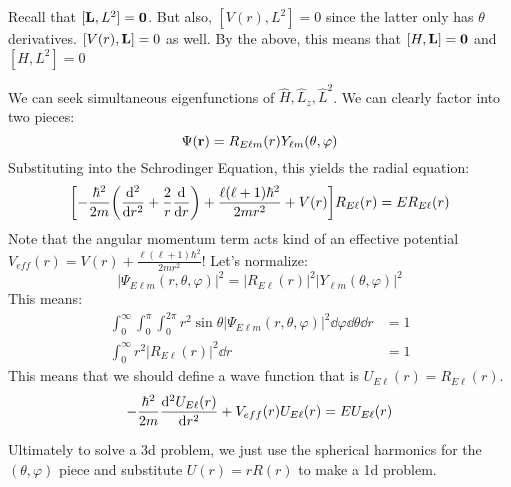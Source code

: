 Recall that $[\mathbf{L}, L^2] = \mathbf{0}$. But also, $[V(r), L^2] = 0$ since the latter only has $\theta$ derivatives.
$[V(r), \mathbf{L}] = 0$ as well.
By the above, this means that $[H, \mathbf{L}] = \mathbf{0}$ 
and $[H, L^2] = 0$

We can seek simultaneous eigenfunctions of $\hat{H}, \hat{L}_z, \hat{L}^2$. We can clearly factor into two pieces:
\[ \Psi(\mathbf{r}) = R_{E\ell m}(r) Y_{\ell m}(\theta, \varphi) \]
Substituting into the Schrodinger Equation, this yields the radial equation:
\[ \qty[-\frac{\hbar^2}{2m}\qty(\dv{^2}{r^2} + \frac{2}{r} \dv{}{r}) + \frac{\ell(\ell + 1)\hbar^2}{2mr^2} + V(r)] R_{E\ell}(r) = ER_{E\ell}(r) \]
Note that the angular momentum term acts kind of an effective potential $V_{eff}(r) = V(r) + \frac{\ell(\ell + 1)\hbar^2}{2mr^2}$! Let's normalize:
\[ |\Psi_{E\ell m}(r, \theta, \varphi)|^2 = |R_{E \ell}(r)|^2 |Y_{\ell m}(\theta, \varphi)|^2 \]
This means:
\begin{align*}
    \int_{0}^{\infty} \int_{0}^{\pi} \int_{0}^{2\pi} r^2 \sin\theta |\Psi_{E\ell m}(r, \theta, \varphi)|^2 \dd{\varphi} \dd{\theta} \dd{r} &= 1 \\
    \int_{0}^{\infty} r^2 |R_{E\ell}(r)|^2 \dd{r} &= 1
\end{align*}
This means that we should define a wave function that is $U_{E\ell}(r) = R_{E\ell}(r)$.
\[ -\frac{\hbar^2}{2m} \dv{^2 U_{E\ell}(r)}{r^2} + V_{eff}(r) U_{E \ell}(r) = E U_{E\ell}(r) \]

Ultimately to solve a 3d problem, we just use the spherical harmonics for the $(\theta, \varphi)$ piece
and substitute $U(r) = r R(r)$ to make a 1d problem.

